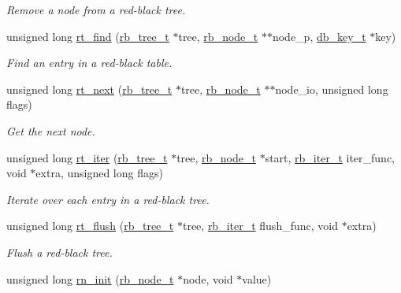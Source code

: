 \begin{CompactItemize}
\begin{CompactList}\small\item\em Remove a node from a red-black tree. \item\end{CompactList}\item 
unsigned long \hyperlink{group__dbprim__rbtree_ga10}{rt\_\-find} (\hyperlink{struct__rb__tree__s}{rb\_\-tree\_\-t} $\ast$tree, \hyperlink{struct__rb__node__s}{rb\_\-node\_\-t} $\ast$$\ast$node\_\-p, \hyperlink{struct__db__key__s}{db\_\-key\_\-t} $\ast$key)
\begin{CompactList}\small\item\em Find an entry in a red-black table. \item\end{CompactList}\item 
unsigned long \hyperlink{group__dbprim__rbtree_ga11}{rt\_\-next} (\hyperlink{struct__rb__tree__s}{rb\_\-tree\_\-t} $\ast$tree, \hyperlink{struct__rb__node__s}{rb\_\-node\_\-t} $\ast$$\ast$node\_\-io, unsigned long flags)
\begin{CompactList}\small\item\em Get the next node. \item\end{CompactList}\item 
unsigned long \hyperlink{group__dbprim__rbtree_ga12}{rt\_\-iter} (\hyperlink{struct__rb__tree__s}{rb\_\-tree\_\-t} $\ast$tree, \hyperlink{struct__rb__node__s}{rb\_\-node\_\-t} $\ast$start, \hyperlink{group__dbprim__rbtree_ga2}{rb\_\-iter\_\-t} iter\_\-func, void $\ast$extra, unsigned long flags)
\begin{CompactList}\small\item\em Iterate over each entry in a red-black tree. \item\end{CompactList}\item 
unsigned long \hyperlink{group__dbprim__rbtree_ga13}{rt\_\-flush} (\hyperlink{struct__rb__tree__s}{rb\_\-tree\_\-t} $\ast$tree, \hyperlink{group__dbprim__rbtree_ga2}{rb\_\-iter\_\-t} flush\_\-func, void $\ast$extra)
\begin{CompactList}\small\item\em Flush a red-black tree. \item\end{CompactList}\item 
unsigned long \hyperlink{group__dbprim__rbtree_ga14}{rn\_\-init} (\hyperlink{struct__rb__node__s}{rb\_\-node\_\-t} $\ast$node, void $\ast$value)

\end{CompactItemize}
